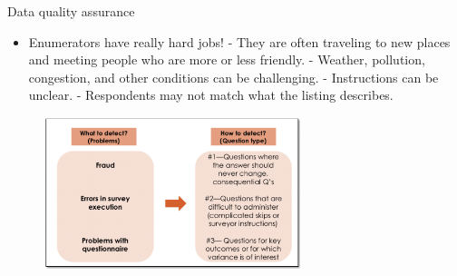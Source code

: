 \documentclass[aspectratio=169]{beamer}
\begin{document}
\begin{frame}[fragile]{Data quality assurance}
\begin{multicols}{2}	
	
	\begin{itemize}[<default overlay specification>]
		\item<1> Enumerators have really hard jobs!
			\newline - They are often traveling to new places and meeting people who are more or less friendly.
			\newline - Weather, pollution, congestion, and other conditions can be challenging.
			\newline - Instructions can be unclear.
			\newline - Respondents may not match what the listing describes.
	\end{itemize}
	
	\begin{figure}
		\centering
		\includegraphics[width=75mm]{img/Quality}
	\end{figure}
	
\end{multicols}
\end{frame}
\end{document}
